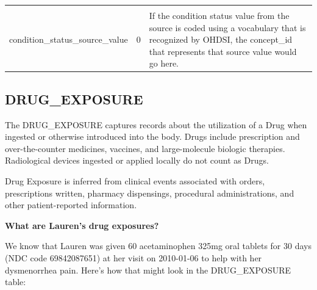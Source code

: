 \documentclass[]{book}
\begin{document}
\begin{longtable}[]{@{}lll@{}}
\begin{minipage}[t]{0.50\columnwidth}
\end{minipage}\tabularnewline
\begin{minipage}[t]{0.27\columnwidth}\raggedright
condition\_status\_source\_value\strut
\end{minipage} & \begin{minipage}[t]{0.14\columnwidth}\raggedright
0\strut
\end{minipage} & \begin{minipage}[t]{0.50\columnwidth}\raggedright
If the condition status value from the source is coded using a vocabulary that is recognized by OHDSI, the concept\_id that represents that source value would go here.\strut
\end{minipage}\tabularnewline
\bottomrule
\end{longtable}

\hypertarget{drugExposure}{%
\subsection{DRUG\_EXPOSURE}\label{drugExposure}}

The DRUG\_EXPOSURE captures records about the utilization of a Drug when ingested or otherwise introduced into the body. Drugs include prescription and over-the-counter medicines, vaccines, and large-molecule biologic therapies. Radiological devices ingested or applied locally do not count as Drugs.

Drug Exposure is inferred from clinical events associated with orders, prescriptions written, pharmacy dispensings, procedural administrations, and other patient-reported information.

\textbf{What are Lauren's drug exposures?}

We know that Lauren was given 60 acetaminophen 325mg oral tablets for 30 days (NDC code 69842087651) at her visit on 2010-01-06 to help with her dysmenorrhea pain. Here's how that might look in the DRUG\_EXPOSURE table:
\end{document}
